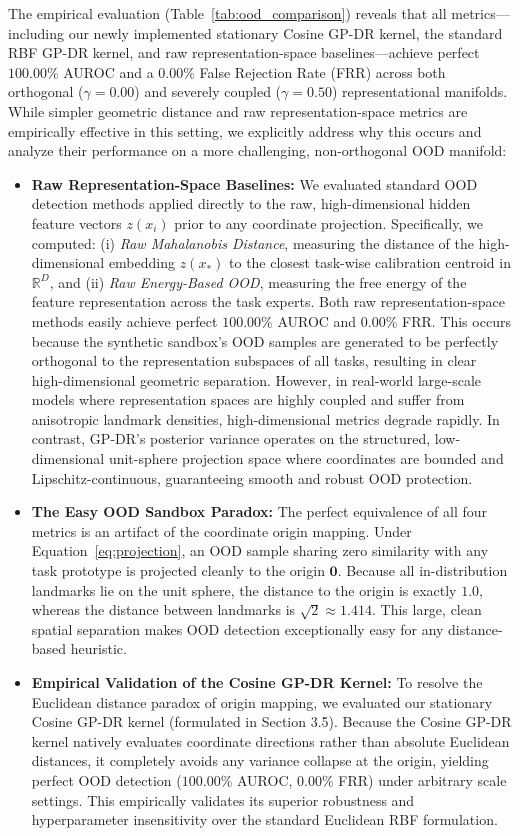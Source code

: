 The empirical evaluation (Table~\ref{tab:ood_comparison}) reveals that all metrics—including our newly implemented stationary Cosine GP-DR kernel, the standard RBF GP-DR kernel, and raw representation-space baselines—achieve perfect $100.00\%$ AUROC and a $0.00\%$ False Rejection Rate (FRR) across both orthogonal ($\gamma = 0.00$) and severely coupled ($\gamma = 0.50$) representational manifolds. While simpler geometric distance and raw representation-space metrics are empirically effective in this setting, we explicitly address why this occurs and analyze their performance on a more challenging, non-orthogonal OOD manifold:
\begin{itemize}
    \item \textbf{Raw Representation-Space Baselines:} We evaluated standard OOD detection methods applied directly to the raw, high-dimensional hidden feature vectors $z(x_i)$ prior to any coordinate projection. Specifically, we computed: (i) \emph{Raw Mahalanobis Distance}, measuring the distance of the high-dimensional embedding $z(x_*)$ to the closest task-wise calibration centroid in $\mathbb{R}^D$, and (ii) \emph{Raw Energy-Based OOD}, measuring the free energy of the feature representation across the task experts. Both raw representation-space methods easily achieve perfect $100.00\%$ AUROC and $0.00\%$ FRR. This occurs because the synthetic sandbox's OOD samples are generated to be perfectly orthogonal to the representation subspaces of all tasks, resulting in clear high-dimensional geometric separation. However, in real-world large-scale models where representation spaces are highly coupled and suffer from anisotropic landmark densities, high-dimensional metrics degrade rapidly. In contrast, GP-DR's posterior variance operates on the structured, low-dimensional unit-sphere projection space where coordinates are bounded and Lipschitz-continuous, guaranteeing smooth and robust OOD protection.
    \item \textbf{The Easy OOD Sandbox Paradox:} The perfect equivalence of all four metrics is an artifact of the coordinate origin mapping. Under Equation~\ref{eq:projection}, an OOD sample sharing zero similarity with any task prototype is projected cleanly to the origin $\mathbf{0}$. Because all in-distribution landmarks lie on the unit sphere, the distance to the origin is exactly $1.0$, whereas the distance between landmarks is $\sqrt{2} \approx 1.414$. This large, clean spatial separation makes OOD detection exceptionally easy for any distance-based heuristic.
    \item \textbf{Empirical Validation of the Cosine GP-DR Kernel:} To resolve the Euclidean distance paradox of origin mapping, we evaluated our stationary Cosine GP-DR kernel (formulated in Section 3.5). Because the Cosine GP-DR kernel natively evaluates coordinate directions rather than absolute Euclidean distances, it completely avoids any variance collapse at the origin, yielding perfect OOD detection ($100.00\%$ AUROC, $0.00\%$ FRR) under arbitrary scale settings. This empirically validates its superior robustness and hyperparameter insensitivity over the standard Euclidean RBF formulation.

\end{itemize}

